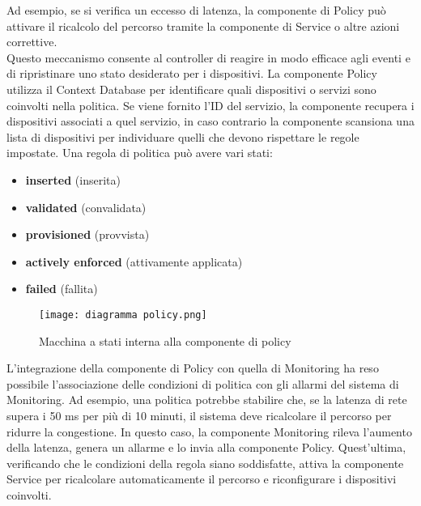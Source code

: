 Ad esempio, se si verifica un eccesso di latenza, la componente di Policy può attivare il ricalcolo del percorso tramite la componente di Service o altre azioni correttive.
\\Questo meccanismo consente al controller di reagire in modo efficace agli eventi e di ripristinare uno stato desiderato per i dispositivi.
La componente Policy utilizza il Context Database per identificare quali dispositivi o servizi sono coinvolti nella politica.
Se viene fornito l'ID del servizio, la componente recupera i dispositivi associati a quel servizio, in caso contrario la componente scansiona una lista di dispositivi per individuare quelli che devono rispettare le regole impostate. 
Una regola di politica può avere vari stati:
\begin{itemize}
    \item \textbf{inserted} (inserita)
    \item \textbf{validated} (convalidata)
    \item \textbf{provisioned} (provvista)
    \item \textbf{actively enforced} (attivamente applicata)
    \item \textbf{failed} (fallita)
\end{itemize}
\begin{figure}[h]
    \centering
   \texttt{[image: diagramma policy.png]}
    \caption{Macchina a stati interna alla componente di policy \cite{D32}}
    \label{fig:diagramma}
\end{figure}
L'integrazione della componente di Policy con quella di Monitoring ha reso possibile l'associazione delle condizioni di politica con gli allarmi del sistema di Monitoring.
Ad esempio, una politica potrebbe stabilire che, se la latenza di rete supera i 50 ms per più di 10 minuti, il sistema deve ricalcolare il percorso per ridurre la congestione. 
In questo caso, la componente Monitoring rileva l’aumento della latenza, genera un allarme e lo invia alla componente Policy. Quest'ultima, verificando che le condizioni della regola 
siano soddisfatte, attiva la componente Service per ricalcolare automaticamente il percorso e riconfigurare i dispositivi coinvolti.

